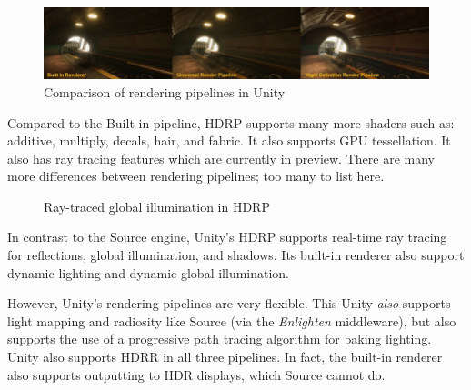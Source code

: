 \documentclass[a4paper, 12pt]{scrartcl}
\begin{document}
\begin{figure}[!htb]
  \centering
  \includegraphics[width=\linewidth]{images/unity_pipelines.png}
  \caption{Comparison of rendering pipelines in Unity}
  \label{fig:unity_pipelines}
\end{figure}

Compared to the Built-in pipeline, HDRP supports many more shaders such as: additive, multiply, decals, hair, and fabric. It also supports GPU tessellation. It also has ray tracing features which are currently in preview. There are many more differences between rendering pipelines; too many to list here.

\begin{figure}[!htb]
  \centering
  \qquad
  \caption{Ray-traced global illumination in HDRP}
  \label{fig:unity_rt_gi}
\end{figure}

In contrast to the Source engine, Unity's HDRP supports real-time ray tracing for reflections, global illumination, and shadows. Its built-in renderer also support dynamic lighting and dynamic global illumination.

However, Unity's rendering pipelines are very flexible. This Unity \textit {also} supports light mapping and radiosity like Source (via the \textit{Enlighten} middleware), but also supports the use of a progressive path tracing algorithm for baking lighting. Unity also supports HDRR in all three pipelines. In fact, the built-in renderer also supports outputting to HDR displays, which Source cannot do.
\end{document}
